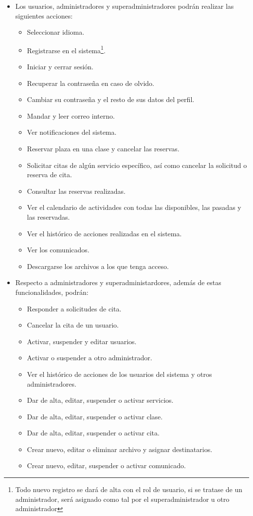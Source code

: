 \begin{itemize}
\item Los usuarios, administradores y superadministradores podrán realizar las siguientes acciones: 

\begin{itemize}
\item Seleccionar idioma.
\item Registrarse en el sistema\footnote{Todo nuevo registro se dará de alta con el rol de usuario, si se tratase de un administrador, será asignado como tal por el superadministrador u otro administrador}.
\item Iniciar y cerrar sesión.
\item Recuperar la contraseña en caso de olvido.
\item Cambiar su contraseña y el resto de sus datos del perfil.
\item Mandar y leer correo interno.
\item Ver notificaciones del sistema.
\item Reservar plaza en una clase y cancelar las reservas.
\item Solicitar citas de algún servicio específico, así como cancelar la solicitud o reserva de cita.
\item Consultar las reservas realizadas.
\item Ver el calendario de actividades con todas las disponibles, las pasadas y las reservadas.
\item Ver el histórico de acciones realizadas en el sistema.
\item Ver los comunicados.
\item Descargarse los archivos a los que tenga acceso. 
\end{itemize}

\item Respecto a administradores y superadministardores, además de estas funcionalidades, podrán: 

\begin{itemize}
\item Responder a solicitudes de cita.
\item Cancelar la cita de un usuario.
\item Activar, suspender y editar usuarios.
\item Activar o suspender a otro administrador.
\item Ver el histórico de acciones de los usuarios del sistema y otros administradores.
\item Dar de alta, editar, suspender o activar servicios.
\item Dar de alta, editar, suspender o activar clase.
\item Dar de alta, editar, suspender o activar cita.
\item Crear nuevo, editar o eliminar archivo y asignar destinatarios.
\item Crear nuevo, editar, suspender o activar comunicado.
\end{itemize}


\end{itemize}

